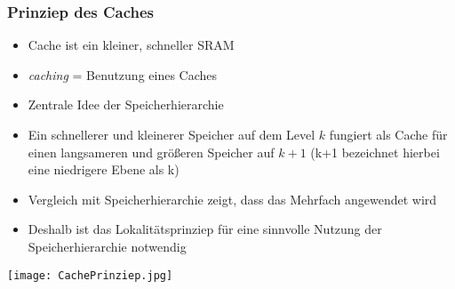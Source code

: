 		\subsubsection{Prinziep des Caches}
			\begin{minipage}{0.5\textwidth}
				\begin{itemize}
					\item Cache ist ein kleiner, schneller SRAM
					\item \textit{caching} = Benutzung eines Caches
					\item Zentrale Idee der Speicherhierarchie
					\item Ein schnellerer und kleinerer Speicher auf dem Level $k$ fungiert als Cache für einen langsameren
						und grö\ss eren Speicher auf $k+1$ (k+1 bezeichnet hierbei eine niedrigere Ebene als k)
					\item Vergleich mit Speicherhierarchie zeigt, dass das Mehrfach angewendet wird
					\item Deshalb ist das Lokalitätsprinziep für eine sinnvolle Nutzung der Speicherhierarchie notwendig
				\end{itemize}
			\end{minipage}
			\begin{minipage}{0.45\textwidth}
				\begin{center}
					\texttt{[image: CachePrinziep.jpg]}
				\end{center}
			\end{minipage}


